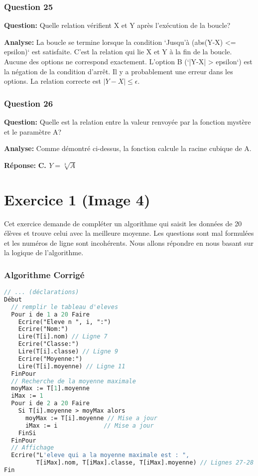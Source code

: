\documentclass[12pt,a4paper]{article}
\begin{document}
\subsubsection{Question 25}
\textbf{Question:} Quelle relation vérifient X et Y après l'exécution de la boucle?

\textbf{Analyse:} La boucle se termine lorsque la condition `Jusqu'à (abs(Y-X) <= epsilon)` est satisfaite. C'est la relation qui lie X et Y à la fin de la boucle. Aucune des options ne correspond exactement. L'option B (`|Y-X| > epsilon`) est la négation de la condition d'arrêt. Il y a probablement une erreur dans les options. La relation correcte est $|Y-X| \le \epsilon$.

\subsubsection{Question 26}
\textbf{Question:} Quelle est la relation entre la valeur renvoyée par la fonction mystère et le paramètre A?

\textbf{Analyse:} Comme démontré ci-dessus, la fonction calcule la racine cubique de A.

\textbf{Réponse:} \textbf{C. $Y = \sqrt[3]{A}$}

\section{Exercice 1 (Image 4)}
Cet exercice demande de compléter un algorithme qui saisit les données de 20 élèves et trouve celui avec la meilleure moyenne. Les questions sont mal formulées et les numéros de ligne sont incohérents. Nous allons répondre en nous basant sur la logique de l'algorithme.

\subsubsection{Algorithme Corrigé}
\begin{lstlisting}[language=Pascal]
// ... (déclarations)
Début
  // remplir le tableau d'eleves
  Pour i de 1 a 20 Faire
    Ecrire("Eleve n ", i, ":")
    Ecrire("Nom:")
    Lire(T[i].nom) // Ligne 7
    Ecrire("Classe:")
    Lire(T[i].classe) // Ligne 9
    Ecrire("Moyenne:")
    Lire(T[i].moyenne) // Ligne 11
  FinPour
  // Recherche de la moyenne maximale
  moyMax := T[1].moyenne
  iMax := 1
  Pour i de 2 a 20 Faire
    Si T[i].moyenne > moyMax alors
      moyMax := T[i].moyenne // Mise a jour
      iMax := i             // Mise a jour
    FinSi
  FinPour
  // Affichage
  Ecrire("L'eleve qui a la moyenne maximale est : ",
         T[iMax].nom, T[iMax].classe, T[iMax].moyenne) // Lignes 27-28
Fin
\end{lstlisting}
\end{document}
